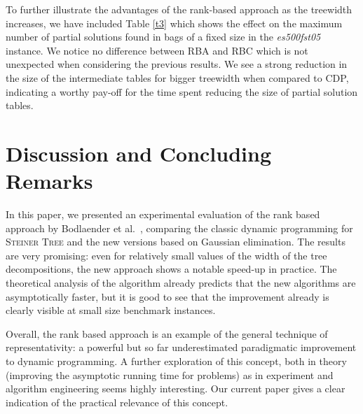 \documentclass{llncs}
\begin{document}
To further illustrate the advantages of the rank-based approach as the
treewidth increases, we have included Table \ref{t3} which shows the effect on the maximum number of partial solutions found in bags of a fixed size in the \emph{es500fst05} instance. We notice no difference between RBA and RBC which is not unexpected when considering the previous results. We see a strong reduction in the size of the intermediate tables for bigger treewidth when compared to CDP, indicating a worthy pay-off for the time spent reducing the size of partial solution tables.

\section{Discussion and Concluding Remarks}
\label{section:conclusions}
In this paper, we presented an experimental evaluation of the rank based approach by Bodlaender et al.~\cite{BodlaenderCKN12}, comparing the classic dynamic programming for 
\textsc{Steiner Tree} and the new versions based on Gaussian elimination. The results are very promising:
even for relatively small values of the width of the tree decompositions, the new approach shows
a notable speed-up in practice.
The theoretical analysis of the algorithm already predicts that the new algorithms are asymptotically faster,
but it is good to see that the improvement already is clearly visible at small size benchmark instances.

Overall, the rank based approach is an example of the general technique of representativity: a powerful but
so far underestimated paradigmatic improvement to dynamic programming. A further exploration of this
concept, both in theory (improving the asymptotic running time for problems) as in experiment and
algorithm engineering seems highly interesting. Our current paper gives a clear indication of the practical
relevance of this concept.
\end{document}
